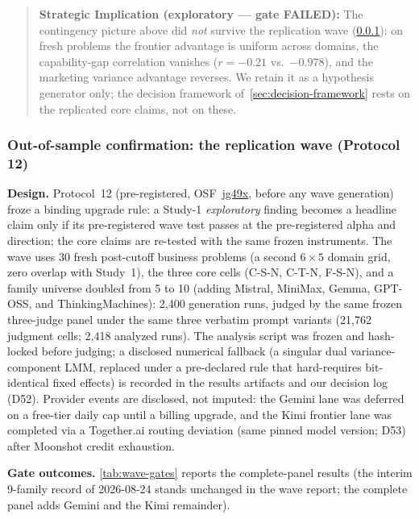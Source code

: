\documentclass[12pt,a4paper]{article}
\begin{document}
\begin{quote}
\textbf{Strategic Implication (exploratory --- gate FAILED):} The contingency
picture above did \emph{not} survive the replication wave
(\cref{sec:wave}): on fresh problems the frontier advantage is uniform across
domains, the capability-gap correlation vanishes ($r = -0.21$ vs.\
$-0.978$), and the marketing variance advantage reverses. We retain it as a
hypothesis generator only; the decision framework
of~\cref{sec:decision-framework} rests on the replicated core claims, not on
these.
\end{quote}

\subsubsection{Out-of-sample confirmation: the replication wave (Protocol 12)}\label{sec:wave}

\textbf{Design.} Protocol~12 (pre-registered, OSF~\href{https://osf.io/jg49x}{jg49x},
before any wave generation) froze a binding upgrade rule: a Study-1
\emph{exploratory} finding becomes a headline claim only if its pre-registered
wave test passes at the pre-registered alpha and direction; the core claims are
re-tested with the same frozen instruments. The wave uses 30 fresh post-cutoff
business problems (a second $6 \times 5$ domain grid, zero overlap with
Study~1), the three core cells (C-S-N, C-T-N, F-S-N), and a family universe
doubled from 5 to 10 (adding Mistral, MiniMax, Gemma, GPT-OSS, and
ThinkingMachines): 2{,}400 generation runs, judged by the same frozen
three-judge panel under the same three verbatim prompt variants
(21{,}762 judgment cells; 2{,}418 analyzed runs). The analysis script was
frozen and hash-locked before judging; a disclosed numerical fallback (a
singular dual variance-component LMM, replaced under a pre-declared rule that
hard-requires bit-identical fixed effects) is recorded in the results artifacts
and our decision log (D52). Provider events are disclosed, not imputed: the
Gemini lane was deferred on a free-tier daily cap until a billing upgrade, and
the Kimi frontier lane was completed via a Together.ai routing deviation
(same pinned model version; D53) after Moonshot credit exhaustion.

\textbf{Gate outcomes.} \cref{tab:wave-gates} reports the complete-panel
results (the interim 9-family record of 2026-08-24 stands unchanged in the
wave report; the complete panel adds Gemini and the Kimi remainder).
\end{document}
